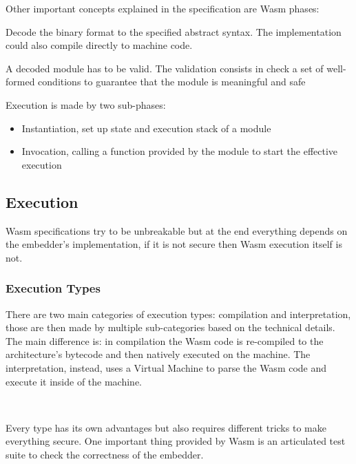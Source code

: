 \documentclass[../main.tex]{subfiles}
\begin{document}
Other important concepts explained in the specification are Wasm phases:

\begin{description}[font=$\bullet$ \scshape\bfseries]
  \item[Decoding]
        Decode the binary format to the specified abstract syntax. The implementation could also compile directly to machine code.
  \item[Validation]
        A decoded module has to be valid. The validation consists in check a set of well-formed conditions to guarantee that the module is meaningful and safe ~\cite{wasm-polkadot-wiki}
  \item[Execution]
        Execution is made by two sub-phases:
        \begin{itemize}
          \item Instantiation, set up state and execution stack of a module
          \item Invocation, calling a function provided by the module to start the effective execution
        \end{itemize}
\end{description}

\subsection{Execution}

Wasm specifications try to be unbreakable but at the end everything depends on the embedder's implementation, if it is not secure then Wasm execution itself is not.

\subsubsection{Execution Types}

There are two main categories of execution types: compilation and interpretation, those are then made by multiple sub-categories based on the technical details. The main difference is: in compilation the Wasm code is re-compiled to the architecture's bytecode and then natively executed on the machine. The interpretation, instead, uses a Virtual Machine to parse the Wasm code and execute it inside of the machine.

\

Every type has its own advantages but also requires different tricks to make everything secure. One important thing provided by Wasm is an articulated test suite to check the correctness of the embedder.~\cite{wasm-testsuite}
\end{document}
